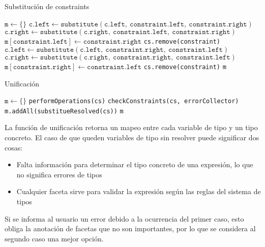 \begin{algorithm}\captionsetup{labelsep=newline}
  \centering
  \caption{Substitución de constraints}
  \label{pseudosubst}
    \begin{algorithmic}[1]
          \State $\mathtt{m\gets \{\}}$
                \State $\mathtt{c.left\gets substitute(c.left,\ constraint.left,\ constraint.right)}$
                \State $\mathtt{c.right\gets substitute(c.right,\ constraint.left,\ constraint.right)}$
              \EndFor
              \State $\mathtt{m[constraint.left]\gets constraint.right}$
              \State \texttt{cs.remove(constraint)}
            \EndIf
                \State $\mathtt{c.left\gets substitute(c.left,\ constraint.right,\ constraint.left)}$
                \State $\mathtt{c.right\gets substitute(c.right,\ constraint.right,\ constraint.left)}$
              \EndFor
              \State $\mathtt{m[constraint.right]\gets constraint.left}$
              \State \texttt{cs.remove(constraint)}
            \EndIf
          \EndFor
          \State \Return \texttt{m}
      \EndFunction
    \end{algorithmic}
\end{algorithm}

\begin{algorithm}\captionsetup{labelsep=newline}
  \centering
  \caption{Unificación}
  \label{pseudouni}
    \begin{algorithmic}[1]
          \State $\mathtt{m\gets \{\}}$
            \State \texttt{performOperations(cs)}
            \State \texttt{checkConstraints(cs, errorCollector)}
            \State \texttt{m.addAll(substitueResolved(cs))}
          \EndWhile
          \State \Return \texttt{m}
      \EndFunction
    \end{algorithmic}
\end{algorithm}
La función de unificación retorna un mapeo entre cada variable de tipo y un tipo concreto. El caso de que queden variables de tipo sin resolver puede significar dos cosas:

\begin{itemize}
  \item Falta información para determinar el tipo concreto de una expresión, lo que no significa errores de tipos
  \item Cualquier faceta sirve para validar la expresión según las reglas del sistema de tipos
\end{itemize}

Si se informa al usuario un error debido a la ocurrencia del primer caso, esto obliga la anotación de facetas que no son importantes, por lo que se considera al segundo caso una mejor opción.
